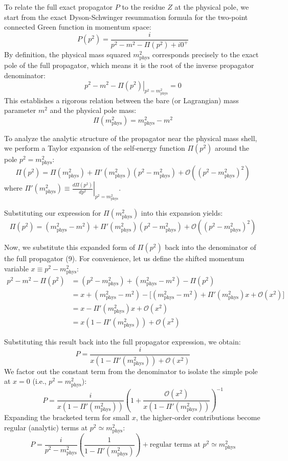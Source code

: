 To relate the full exact propagator $P$ to the residue $Z$ at the physical pole, we start from the exact Dyson-Schwinger resummation formula for the two-point connected Green function in momentum space:
\[
    P(p^2) = \frac{i}{p^2 - m^2 - \Pi(p^2) + i0^+}
\]
By definition, the physical mass squared $m_{\text{phys}}^2$ corresponds precisely to the exact pole of the full propagator, which means it is the root of the inverse propagator denominator:
\[
    \left. p^2 - m^2 - \Pi(p^2) \right|_{p^2 = m_{\text{phys}}^2} = 0
\]
This establishes a rigorous relation between the bare (or Lagrangian) mass parameter $m^2$ and the physical pole mass:
\[
    \Pi(m_{\text{phys}}^2) = m_{\text{phys}}^2 - m^2
\]

To analyze the analytic structure of the propagator near the physical mass shell, we perform a Taylor expansion of the self-energy function $\Pi(p^2)$ around the pole $p^2 = m_{\text{phys}}^2$:
\[
    \Pi(p^2) = \Pi(m_{\text{phys}}^2) + \Pi'(m_{\text{phys}}^2)(p^2 - m_{\text{phys}}^2) + \mathcal{O}\left((p^2 - m_{\text{phys}}^2)^2\right)
\]
where $\Pi'(m_{\text{phys}}^2) \equiv \left. \frac{d\Pi(p^2)}{dp^2} \right|_{p^2 = m_{\text{phys}}^2}$.

Substituting our expression for $\Pi(m_{\text{phys}}^2)$ into this expansion yields:
\[
    \Pi(p^2) = (m_{\text{phys}}^2 - m^2) + \Pi'(m_{\text{phys}}^2)(p^2 - m_{\text{phys}}^2) + \mathcal{O}\left((p^2 - m_{\text{phys}}^2)^2\right)
\]

Now, we substitute this expanded form of $\Pi(p^2)$ back into the denominator of the full propagator (9). For convenience, let us define the shifted momentum variable $x \equiv p^2 - m_{\text{phys}}^2$:
\[
    \begin{aligned}
        p^2 - m^2 - \Pi(p^2) & = (p^2 - m_{\text{phys}}^2) + (m_{\text{phys}}^2 - m^2) - \Pi(p^2)                                                    \\
                             & = x + (m_{\text{phys}}^2 - m^2) - \Big[ (m_{\text{phys}}^2 - m^2) + \Pi'(m_{\text{phys}}^2)x + \mathcal{O}(x^2) \Big] \\
                             & = x - \Pi'(m_{\text{phys}}^2)x + \mathcal{O}(x^2)                                                                     \\
                             & = x \left( 1 - \Pi'(m_{\text{phys}}^2) \right) + \mathcal{O}(x^2)
    \end{aligned}
\]

Substituting this result back into the full propagator expression, we obtain:
\[
    P = \frac{i}{x \left( 1 - \Pi'(m_{\text{phys}}^2) \right) + \mathcal{O}(x^2)}
\]
We factor out the constant term from the denominator to isolate the simple pole at $x = 0$ (i.e., $p^2 = m_{\text{phys}}^2$):
\[
    P = \frac{i}{x \left( 1 - \Pi'(m_{\text{phys}}^2) \right)} \left( 1 + \frac{\mathcal{O}(x^2)}{x(1 - \Pi'(m_{\text{phys}}^2))} \right)^{-1}
\]
Expanding the bracketed term for small $x$, the higher-order contributions become regular (analytic) terms at $p^2 \simeq m_{\text{phys}}^2$:
\[
    P = \frac{i}{p^2 - m_{\text{phys}}^2} \left( \frac{1}{1 - \Pi'(m_{\text{phys}}^2)} \right) + \text{regular terms at } p^2 \simeq m_{\text{phys}}^2
\]

